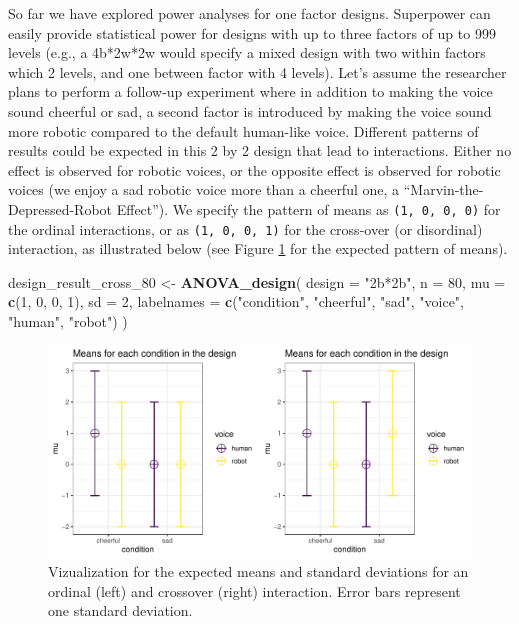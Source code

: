 \documentclass[
  ,jou,floatsintext]{apa6}
\newenvironment{Shaded}{\begin{snugshade}}{\end{snugshade}}
\newcommand{\DataTypeTok}[1]{\textcolor[rgb]{0.13,0.29,0.53}{#1}}
\newcommand{\DecValTok}[1]{\textcolor[rgb]{0.00,0.00,0.81}{#1}}
\newcommand{\KeywordTok}[1]{\textcolor[rgb]{0.13,0.29,0.53}{\textbf{#1}}}
\newcommand{\NormalTok}[1]{#1}
\newcommand{\StringTok}[1]{\textcolor[rgb]{0.31,0.60,0.02}{#1}}
\begin{document}
So far we have explored power analyses for one factor designs.
Superpower can easily provide statistical power for designs with up to three factors of up to 999 levels (e.g., a 4b*2w*2w would specify a mixed design with two within factors which 2 levels, and one between factor with 4 levels).
Let's assume the researcher plans to perform a follow-up experiment where in addition to making the voice sound cheerful or sad, a second factor is introduced by making the voice sound more robotic compared to the default human-like voice.
Different patterns of results could be expected in this 2 by 2 design that lead to interactions.
Either no effect is observed for robotic voices, or the opposite effect is observed for robotic voices (we enjoy a sad robotic voice more than a cheerful one, a \enquote{Marvin-the-Depressed-Robot Effect}).
We specify the pattern of means as \texttt{(1,\ 0,\ 0,\ 0)} for the ordinal interactions, or as \texttt{(1,\ 0,\ 0,\ 1)} for the cross-over (or disordinal) interaction, as illustrated below (see Figure \ref{fig:mean-plot} for the expected pattern of means).

\begin{Shaded}
\begin{Highlighting}[]
\NormalTok{design_result_cross_}\DecValTok{80}\NormalTok{ <-}\StringTok{ }\KeywordTok{ANOVA_design}\NormalTok{(}
 \DataTypeTok{design =} \StringTok{"2b*2b"}\NormalTok{, }\DataTypeTok{n =} \DecValTok{80}\NormalTok{, }
 \DataTypeTok{mu =} \KeywordTok{c}\NormalTok{(}\DecValTok{1}\NormalTok{, }\DecValTok{0}\NormalTok{, }\DecValTok{0}\NormalTok{, }\DecValTok{1}\NormalTok{), }\DataTypeTok{sd =} \DecValTok{2}\NormalTok{,}
 \DataTypeTok{labelnames =} \KeywordTok{c}\NormalTok{(}\StringTok{"condition"}\NormalTok{, }
                \StringTok{"cheerful"}\NormalTok{, }\StringTok{"sad"}\NormalTok{, }
                \StringTok{"voice"}\NormalTok{, }
                \StringTok{"human"}\NormalTok{, }\StringTok{"robot"}\NormalTok{)}
\NormalTok{)}
\end{Highlighting}
\end{Shaded}

\begin{figure}
\centering
\includegraphics{0.1_Simulation_Based_Power_Analysis_For_Factorial_ANOVA_Designs_files/figure-latex/mean-plot-1.pdf}
\caption{\label{fig:mean-plot}Vizualization for the expected means and standard deviations for an ordinal (left) and crossover (right) interaction. Error bars represent one standard deviation.}
\end{figure}
\end{document}
